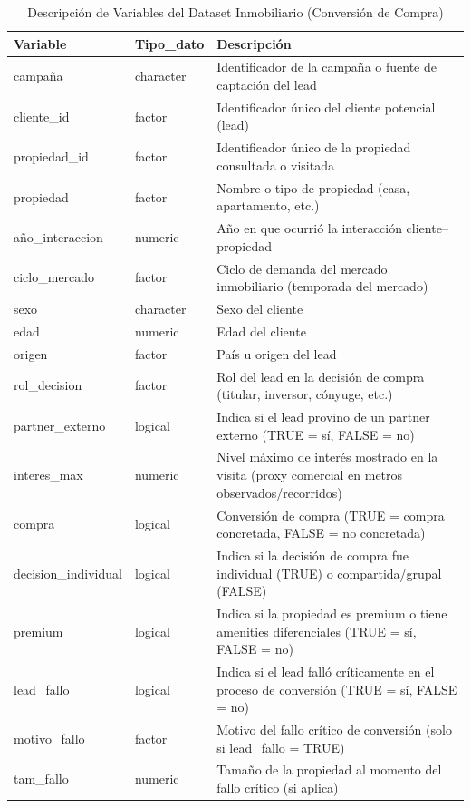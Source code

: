 \documentclass[
  letterpaper,
  DIV=11,
  numbers=noendperiod]{scrartcl}
\begin{document}
\begin{longtable}[t]{lll}
\caption{\label{tab:unnamed-chunk-4}Descripción de Variables del Dataset Inmobiliario (Conversión de Compra)}\\
\toprule
Variable & Tipo\_dato & Descripción\\
\midrule
campaña & character & Identificador de la campaña o fuente de captación del lead\\
cliente\_id & factor & Identificador único del cliente potencial (lead)\\
propiedad\_id & factor & Identificador único de la propiedad consultada o visitada\\
propiedad & factor & Nombre o tipo de propiedad (casa, apartamento, etc.)\\
año\_interaccion & numeric & Año en que ocurrió la interacción cliente–propiedad\\
\addlinespace
ciclo\_mercado & factor & Ciclo de demanda del mercado inmobiliario (temporada del mercado)\\
sexo & character & Sexo del cliente\\
edad & numeric & Edad del cliente\\
origen & factor & País u origen del lead\\
rol\_decision & factor & Rol del lead en la decisión de compra (titular, inversor, cónyuge, etc.)\\
\addlinespace
partner\_externo & logical & Indica si el lead provino de un partner externo (TRUE = sí, FALSE = no)\\
interes\_max & numeric & Nivel máximo de interés mostrado en la visita (proxy comercial en metros observados/recorridos)\\
compra & logical & Conversión de compra (TRUE = compra concretada, FALSE = no concretada)\\
decision\_individual & logical & Indica si la decisión de compra fue individual (TRUE) o compartida/grupal (FALSE)\\
premium & logical & Indica si la propiedad es premium o tiene amenities diferenciales (TRUE = sí, FALSE = no)\\
\addlinespace
lead\_fallo & logical & Indica si el lead falló críticamente en el proceso de conversión (TRUE = sí, FALSE = no)\\
motivo\_fallo & factor & Motivo del fallo crítico de conversión (solo si lead\_fallo = TRUE)\\
tam\_fallo & numeric & Tamaño de la propiedad al momento del fallo crítico (si aplica)\\

\end{longtable}
\end{document}
